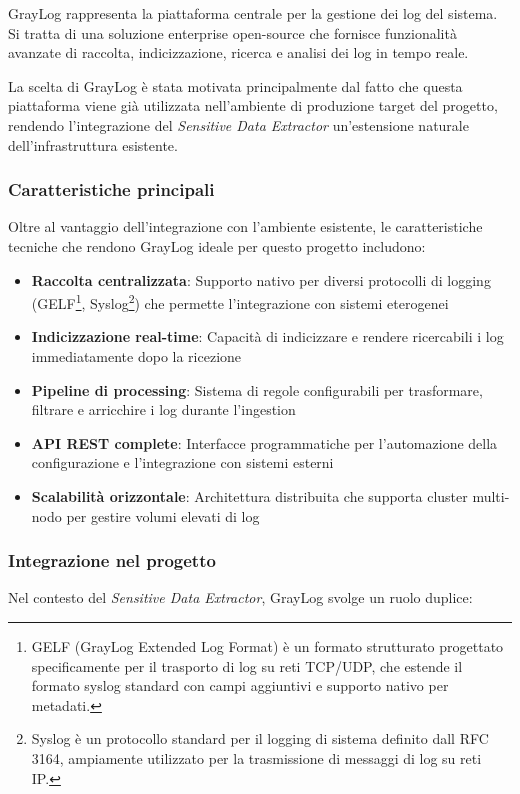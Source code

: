 \documentclass[12pt]{report}
\begin{document}
GrayLog rappresenta la piattaforma centrale per la gestione dei log del sistema. Si tratta di una soluzione enterprise open-source che fornisce funzionalità avanzate di raccolta, indicizzazione, ricerca e analisi dei log in tempo reale.

La scelta di GrayLog è stata motivata principalmente dal fatto che questa piattaforma viene già utilizzata nell'ambiente di produzione target del progetto, rendendo l'integrazione del \textit{Sensitive Data Extractor} un'estensione naturale dell'infrastruttura esistente.

\subsubsection{Caratteristiche principali}
Oltre al vantaggio dell'integrazione con l'ambiente esistente, le caratteristiche tecniche che rendono GrayLog ideale per questo progetto includono:

\begin{itemize}
    \item \textbf{Raccolta centralizzata}: Supporto nativo per diversi protocolli di logging (GELF\footnote{GELF (GrayLog Extended Log Format) è un formato strutturato progettato specificamente per il trasporto di log su reti TCP/UDP, che estende il formato syslog standard con campi aggiuntivi e supporto nativo per metadati.}, Syslog\footnote{Syslog è un protocollo standard per il logging di sistema definito dall RFC 3164, ampiamente utilizzato per la trasmissione di messaggi di log su reti IP.}) che permette l'integrazione con sistemi eterogenei
    \item \textbf{Indicizzazione real-time}: Capacità di indicizzare e rendere ricercabili i log immediatamente dopo la ricezione
    \item \textbf{Pipeline di processing}: Sistema di regole configurabili per trasformare, filtrare e arricchire i log durante l'ingestion
    \item \textbf{API REST complete}: Interfacce programmatiche per l'automazione della configurazione e l'integrazione con sistemi esterni
    \item \textbf{Scalabilità orizzontale}: Architettura distribuita che supporta cluster multi-nodo per gestire volumi elevati di log
\end{itemize}

\subsubsection{Integrazione nel progetto}
Nel contesto del \textit{Sensitive Data Extractor}, GrayLog svolge un ruolo duplice:
\end{document}
